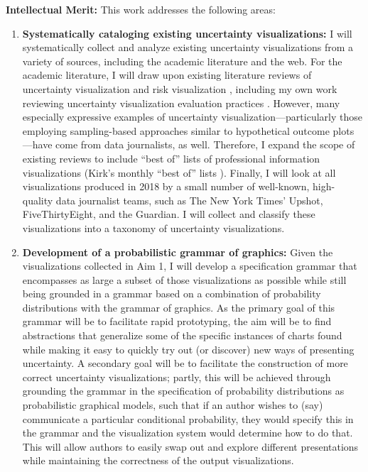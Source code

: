 \documentclass[11pt]{article}
\begin{document}
\noindent\textbf{Intellectual Merit:} This work addresses the following areas:

\vspace{-0.75em}
\begin{enumerate}[noitemsep]
  \item \textbf{Systematically cataloging existing uncertainty visualizations:}
    I will systematically collect and analyze existing uncertainty visualizations from a variety of sources, including the academic literature and the web. For the academic literature, I will draw upon existing literature reviews of uncertainty visualization and risk visualization \cite{MacEachren1992,Ancker2006,Garcia-Retamero2013,maceachren_visualizing_2005}, including my own work reviewing uncertainty visualization evaluation practices \cite{hullman2018pursuit}. However, many especially expressive examples of uncertainty visualization---particularly those employing sampling-based approaches similar to hypothetical outcome plots---have come from data journalists, as well. Therefore, I expand the scope of existing reviews to include ``best of'' lists of professional information visualizations (\eg Kirk's monthly ``best of'' lists \cite{kirk2018march_best_of_vis}). Finally, I will look at all visualizations produced in 2018 by a small number of well-known, high-quality data journalist teams, such as The New York Times’ Upshot, FiveThirtyEight, and the Guardian. I will collect and classify these visualizations into a taxonomy of uncertainty visualizations.
  \item \textbf{Development of a probabilistic grammar of graphics:}
    Given the visualizations collected in Aim 1, I will develop a specification grammar that encompasses as large a subset of those visualizations as possible while still being grounded in a grammar based on a combination of probability distributions with the grammar of graphics. As the primary goal of this grammar will be to facilitate rapid prototyping, the aim will be to find abstractions that generalize some of the specific instances of charts found while making it easy to quickly try out (or discover) new ways of presenting uncertainty. A secondary goal will be to facilitate the construction of more correct uncertainty visualizations; partly, this will be achieved through grounding the grammar in the specification of probability distributions as probabilistic graphical models, such that if an author wishes to (say) communicate a particular conditional probability, they would specify this in the grammar and the visualization system would determine how to do that. This will allow authors to easily swap out and explore different presentations while maintaining the correctness of the output visualizations.

\end{enumerate}
\end{document}
